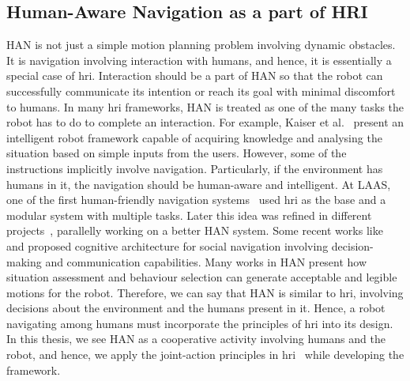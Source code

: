 \subsection{Human-Aware Navigation as a part of HRI}
HAN is not just a simple motion planning problem involving dynamic obstacles. It is navigation involving interaction with humans, and hence, it is essentially a special case of \acrshort{hri}. Interaction should be a part of HAN so that the robot can successfully communicate its intention or reach its goal with minimal discomfort to humans. In many \acrshort{hri} frameworks, HAN is treated as one of the many tasks the robot has to do to complete an interaction. For example, Kaiser et al.~\cite{kaiser1997transfer} present an intelligent robot framework capable of acquiring knowledge and analysing the situation based on simple inputs from the users. However, some of the instructions implicitly involve navigation. Particularly, if the environment has humans in it, the navigation should be human-aware and intelligent. At LAAS, one of the first human-friendly navigation systems~\cite{alami_diligent_2000} used \acrshort{hri} as the base and a modular system with multiple tasks. Later this idea was refined in different projects~\cite{foster2016mummer}, parallelly working on a better HAN system. Some recent works like \cite{vega2018planning} and \cite{vega2018flexible} proposed cognitive architecture for social navigation involving decision-making and communication capabilities. Many works in HAN present how situation assessment and behaviour selection can generate acceptable and legible motions for the robot. Therefore, we can say that HAN is similar to \acrshort{hri}, involving decisions about the environment and the humans present in it. Hence, a robot navigating among humans must incorporate the principles of \acrshort{hri} into its design. In this thesis, we see HAN as a cooperative activity involving humans and the robot, and hence, we apply the joint-action principles in \acrshort{hri}~\cite{curioni2019joint} while developing the framework. 

